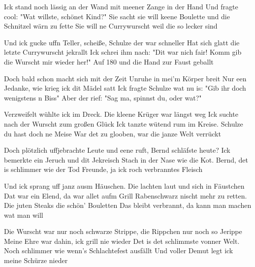 \begin{guitar}
	 
	
	\pagebreak
	Ick stand noch lässig an der Wand mit meener Zange in der Hand
	Und fragte cool: "Wat willste, schönet Kind?"
	Sie sacht sie will keene Boulette und die Schnitzel wärn zu fette
	Sie will ne Currywurscht weil die so lecker sind\vspace{-0.08em}
	
	Und ick gucke uffn Teller, scheiße, Schulze der war schneller
	Hat sich glatt die letzte Currywurscht jekrallt
	Ick schrei ihm nach: "Dit war nich fair! Komm gib die Wurscht mir wieder her!"
	Auf 180 und die Hand zur Faust geballt\vspace{-0.08em}
	
	 \vspace{-0.08em}
	
	Doch bald schon macht sich mit der Zeit Unruhe in mei'm Körper breit
	Nur een Jedanke, wie krieg ick dit Mädel satt
	Ick fragte Schulze wat nu is: "Gib ihr doch wenigstens n Biss"
	Aber der rief: "Sag ma, spinnst du, oder wat?"\vspace{-0.08em}
	
	Verzweifelt wühlte ick im Dreck. Die kleene Krüger war längst weg
	Ick suchte nach der Wurscht zum großen Glück
	Ick tanzte wütend rum im Kreise. Schulze du hast doch ne Meise
	War det zu glooben, war die janze Welt verrückt\vspace{-0.08em}
	
	Doch plötzlich uffjebrachte Leute und eene ruft, Bernd schläfste heute?
	Ick bemerkte ein Jeruch und dit Jekreisch
	Stach in der Nase wie die Kot. Bernd, det is schlimmer wie der Tod
	Freunde, ja ick roch verbranntes Fleisch\vspace{-0.08em}
	
	 \vspace{-0.08em}
	
	Und ick sprang uff janz ausm Häuschen. Die lachten laut und sich in Fäustchen
	Dat war ein Elend, da war allet aufm Grill
	Rabenschwarz nischt mehr zu retten. Die juten Steaks die schön' Bouletten
	Das bleibt verbrannt, da kann man machen wat man will\vspace{-0.08em}
	
	Die Wurscht war nur noch schwarze Strippe, die Rippchen nur noch so Jerippe
	Meine Ehre war dahin, ick grill nie wieder
	Det is det schlimmste vonner Welt. Noch schlimmer wie wenn's Schlachtefest ausfällt
	Und voller Demut legt ick meine Schürze nieder\vspace{-0.08em}
	

\end{guitar}
